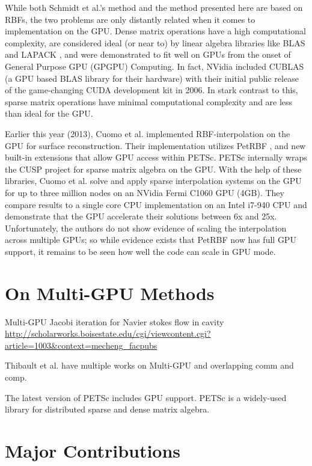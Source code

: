 \documentclass[11pt]{report}
\begin{document}
While both Schmidt et al.'s method and the method presented here are based on RBFs, the two problems are only distantly related when it comes to implementation on the GPU. Dense matrix operations have a high computational complexity, are considered ideal (or near to) by linear algebra libraries like BLAS \cite{BLAS} and LAPACK \cite{Lapack1999}, and were demonstrated to fit well on GPUs from the onset of General Purpose GPU (GPGPU) Computing. In fact, NVidia included CUBLAS \cite{CudaToolkitDoc} (a GPU based BLAS library for their hardware) with their initial public release of the game-changing CUDA development kit in 2006. In stark contrast to this, sparse matrix operations have minimal computational complexity and are less than ideal for the GPU.


Earlier this year (2013), Cuomo et al. \cite{Cuomo2013} implemented RBF-interpolation on the GPU for surface reconstruction. Their implementation utilizes PetRBF \cite{Yokota2010}, and new built-in extensions that allow GPU access within PETSc. PETSc internally wraps the CUSP project \cite{Cusp2012} for sparse matrix algebra on the GPU. With the help of these libraries, Cuomo et al. solve and apply sparse interpolation systems on the GPU for up to three million nodes on an NVidia Fermi C1060 GPU (4GB). They compare results to a single core CPU implementation on an Intel i7-940 CPU and demonstrate that the GPU accelerate their solutions between 6x and 25x. Unfortunately, the authors do not show evidence of scaling the interpolation across multiple GPUs; so while evidence exists that PetRBF now has full GPU support, it remains to be seen how well the code can scale in GPU mode. 
 
\section{On Multi-GPU Methods}
 
Multi-GPU Jacobi iteration for Navier stokes flow in cavity \url{http://scholarworks.boisestate.edu/cgi/viewcontent.cgi?article=1003&context=mecheng_facpubs}

Thibault et al. have multiple works on Multi-GPU and overlapping comm and comp. 

The latest version of PETSc includes GPU support. PETSc is a widely-used library for distributed sparse and dense matrix algebra. 

\section{Major Contributions}
\end{document}

